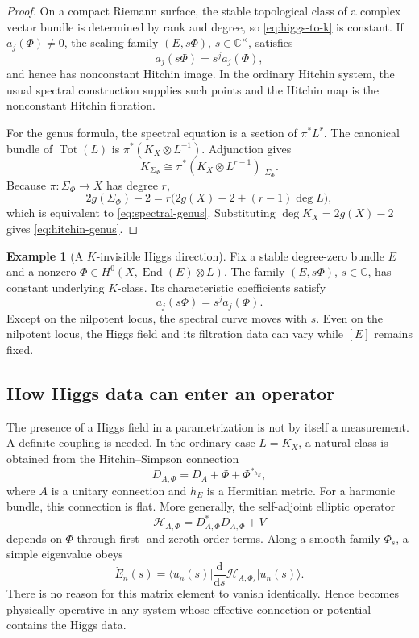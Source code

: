 \documentclass[11pt]{article}
\theoremstyle{definition}
\newtheorem{example}[theorem]{Example}
\theoremstyle{remark}
\newcommand{\CC}{\mathbb C}
\newcommand{\End}{\operatorname{End}}
\newcommand{\cH}{\mathcal H}
\newcommand{\dd}{\mathrm d}
\newcommand{\ket}[1]{\lvert #1\rangle}
\newcommand{\bra}[1]{\langle #1\rvert}
\begin{document}
\begin{proof}
On a compact Riemann surface, the stable topological class of a complex vector
bundle is determined by rank and degree, so \eqref{eq:higgs-to-k} is
constant.  If \(a_j(\Phi)\neq0\), the scaling family
\((E,s\Phi)\), \(s\in\CC^\times\), satisfies
\[
                         a_j(s\Phi)=s^j a_j(\Phi),
\]
and hence has nonconstant Hitchin image.  In the ordinary Hitchin system,
the usual spectral construction supplies such points and the Hitchin map is
the nonconstant Hitchin fibration.

For the genus formula, the spectral equation is a section of
\(\pi^*L^r\).  The canonical bundle of \(\operatorname{Tot}(L)\) is
\(\pi^*(K_X\otimes L^{-1})\).  Adjunction gives
\[
 K_{\Sigma_\Phi}
    \cong
 \pi^*(K_X\otimes L^{r-1})\big|_{\Sigma_\Phi}.
\]
Because \(\pi:\Sigma_\Phi\to X\) has degree \(r\),
\[
 2g(\Sigma_\Phi)-2
   =r\bigl(2g(X)-2+(r-1)\deg L\bigr),
\]
which is equivalent to \eqref{eq:spectral-genus}.  Substituting
\(\deg K_X=2g(X)-2\) gives \eqref{eq:hitchin-genus}.
\end{proof}

\begin{example}[A \(K\)-invisible Higgs direction]
\label{ex:higgs-scaling}
Fix a stable degree-zero bundle \(E\) and a nonzero
\(\Phi\in H^0(X,\End(E)\otimes L)\).  The family
\((E,s\Phi)\), \(s\in\CC\), has constant underlying \(K\)-class.  Its
characteristic coefficients satisfy
\[
                   a_j(s\Phi)=s^j a_j(\Phi).
                   \tag{6.8}\label{eq:higgs-scaling}
\]
Except on the nilpotent locus, the spectral curve moves with \(s\).  Even on
the nilpotent locus, the Higgs field and its filtration data can vary while
\([E]\) remains fixed.
\end{example}

\subsection{How Higgs data can enter an operator}

The presence of a Higgs field in a parametrization is not by itself a
measurement.  A definite coupling is needed.  In the ordinary case
\(L=K_X\), a natural class is obtained from the Hitchin--Simpson connection
\[
                  D_{A,\Phi}=D_A+\Phi+\Phi^{*_{h_E}},
                  \tag{6.9}\label{eq:hitchin-simpson}
\]
where \(A\) is a unitary connection and \(h_E\) is a Hermitian metric.  For a
harmonic bundle, this connection is flat.  More generally, the self-adjoint
elliptic operator
\[
        \cH_{A,\Phi}
         =D_{A,\Phi}^*D_{A,\Phi}+V
         \tag{6.10}\label{eq:higgs-hamiltonian}
\]
depends on \(\Phi\) through first- and zeroth-order terms.  Along a smooth
family \(\Phi_s\), a simple eigenvalue obeys
\[
       \dot E_n(s)
         =\bra{u_n(s)}
           \frac{\dd}{\dd s}\cH_{A,\Phi_s}
           \ket{u_n(s)}.
           \tag{6.11}\label{eq:higgs-FH}
\]
There is no reason for this matrix element to vanish identically.  Hence
 becomes physically operative in any system whose
effective connection or potential contains the Higgs data.
\end{document}
